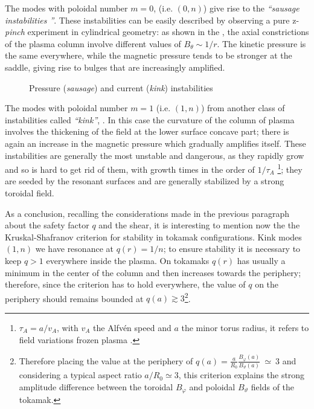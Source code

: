 The modes with poloidal number $m = 0$, (i.e. $(0,n)$) give rise to the \emph{``sausage instabilities ''}. These instabilities can be easily described by observing a pure z-\textit{pinch} experiment in cylindrical geometry: as shown in the \Figure{\ref{fig:press-curr1}}, the axial constrictions of the plasma column involve different values of $B_\theta \sim 1/r$. The kinetic pressure is the same everywhere, while the magnetic pressure tends to be stronger at the saddle, giving rise to bulges that are increasingly amplified.
%
\begin{figure}[ht]
 \centering
 \caption{Pressure (\emph{sausage}) and current (\emph{kink}) instabilities}
\end{figure}

The modes with poloidal number $m = 1$ (i.e. $(1,n)$) from another class of instabilities called \emph{``kink''}, \Figure{\ref{fig:press-curr2}}. In this case the curvature of the column of plasma involves the thickening of the field at the lower surface concave part; there is again an increase in the magnetic pressure which gradually amplifies itself.
%
These instabilities are generally the most unstable and dangerous, as they rapidly grow and so is hard to get rid of them, with growth times in the order of $1/\tau_A$ \footnote{$\tau_A = a/v_A$, with $ v_A $ the Alfvén speed and $a$ the minor torus radius, it refers to field variations frozen plasma \cite{fridberg}.}; they are seeded by the resonant surfaces and are generally stabilized by a strong toroidal field.

As a conclusion, recalling the considerations made in the previous paragraph about the safety factor $ q $ and the shear, it is interesting to mention now the the Kruskal-Shafranov criterion for stability in tokamak configurations. Kink modes $(1,n)$ we have resonance at $q(r)=1/n$; to ensure stability it is necessary to keep $q>1$ everywhere inside the plasma. On tokamaks $ q (r) $ has usually a minimum in the center of the column and then increases towards the periphery; therefore, since the criterion has to hold everywhere, the value of $q$ on the periphery should remains bounded at $ q(a) \gtrsim 3 $\footnote{Therefore placing the value at the periphery of $q(a)=\frac{a}{R_0}\frac{B_\varphi(a)}{B_\vartheta(a)}~\simeq~3$ and considering a typical aspect ratio $a/R_0 \simeq 3$, this criterion explains the strong amplitude difference between the toroidal $B_\varphi$ and poloidal $B_\vartheta$ fields of the tokamak.}.


